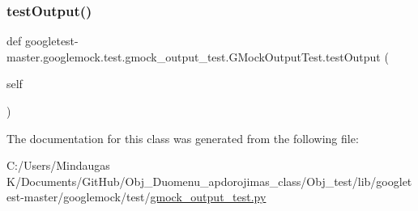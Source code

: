 \subsubsection{\texorpdfstring{testOutput()}{testOutput()}}
{\footnotesize\ttfamily def googletest-\/master.\+googlemock.\+test.\+gmock\+\_\+output\+\_\+test.\+G\+Mock\+Output\+Test.\+test\+Output (\begin{DoxyParamCaption}\item[{}]{self }\end{DoxyParamCaption})}



The documentation for this class was generated from the following file\+:\begin{DoxyCompactItemize}
\item 
C\+:/\+Users/\+Mindaugas K/\+Documents/\+Git\+Hub/\+Obj\+\_\+\+Duomenu\+\_\+apdorojimas\+\_\+class/\+Obj\+\_\+test/lib/googletest-\/master/googlemock/test/\mbox{\hyperlink{_obj__test_2lib_2googletest-master_2googlemock_2test_2gmock__output__test_8py}{gmock\+\_\+output\+\_\+test.\+py}}\end{DoxyCompactItemize}
